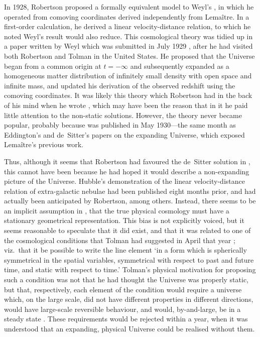 In 1928, Robertson proposed a formally equivalent model to Weyl's \cite{Robertson1928}, in which he operated from comoving coordinates derived independently from Lema\^{i}tre. In a first-order calculation, he derived a linear velocity-distance relation, to which he noted Weyl's result would also reduce. This cosmological theory was tidied up in a paper written by Weyl which was submitted in July 1929 \cite{Weyl1930}, after he had visited both Robertson and Tolman in the United States. He proposed that the Universe began from a common origin at $t=-\infty$ and subsequently expanded as a homogeneous matter distribution of infinitely small density with open space and infinite mass, and updated his derivation of the observed redshift using the comoving coordinates. It was likely this theory which Robertson had in the back of his mind when he wrote \cite{Robertson1929}, which may have been the reason that in it he paid little attention to the non-static solutions. However, the theory never became popular, probably because \cite{Weyl1930} was published in May 1930---the same month as Eddington's and de~Sitter's papers on the expanding Universe, which exposed Lema\^{i}tre's previous work.

Thus, although it seems that Robertson had favoured the de~Sitter solution in \cite{Robertson1929}, this cannot have been because he had hoped it would describe a non-expanding picture of the Universe. Hubble's demonstration of the linear velocity-distance relation of extra-galactic nebulae had been published eight months prior, and had actually been anticipated by Robertson, among others. Instead, there seems to be an implicit assumption in \cite{Robertson1929}, that the true physical cosmology must have a stationary geometrical representation. This bias is not explicitly voiced, but it seems reasonable to speculate that it did exist, and that it was related to one of the cosmological conditions that Tolman had suggested in April that year \cite{Tolman1929a}; viz.~that it be possible to write the line element `in a form which is spherically symmetrical in the spatial variables, symmetrical with respect to past and future time, and static with respect to time.' Tolman's physical motivation for proposing such a condition was not that he had thought the Universe was properly static, but that, respectively, each element of the condition would require a universe which, on the large scale, did not have different properties in different directions, would have large-scale reversible behaviour, and would, by-and-large, be in a steady state \cite{Tolman1929a}. These requirements would be rejected within a year, when it was understood that an expanding, physical Universe could be realised without them.

